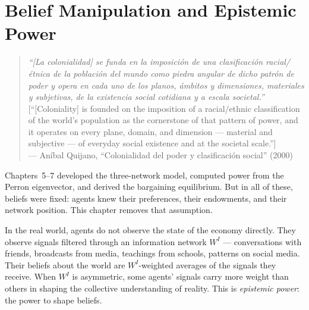 \documentclass[../structural_economics_book.tex]{subfiles}
\begin{document}
\ifSubfilesClassLoaded{\setcounter{chapter}{7}}{}
\chapter{Belief Manipulation and Epistemic Power}\label{ch:08}
\begin{quote}
\textit{``[La colonialidad] se funda en la imposici\'{o}n de una clasificaci\'{o}n racial/\'{e}tnica de la poblaci\'{o}n del mundo como piedra angular de dicho patr\'{o}n de poder y opera en cada uno de los planos, \'{a}mbitos y dimensiones, materiales y subjetivas, de la existencia social cotidiana y a escala societal.''}\\[0.3em]
\textnormal{[``[Coloniality] is founded on the imposition of a racial/ethnic classification of the world's population as the cornerstone of that pattern of power, and it operates on every plane, domain, and dimension --- material and subjective --- of everyday social existence and at the societal scale.'']}\\
\hfill --- An\'{i}bal Quijano, ``Colonialidad del poder y clasificaci\'{o}n social'' (2000)
\end{quote}
\nocite{quijano2000colonialidadclasificacion}

\vspace{1em}

Chapters~5--7 developed the three-network model, computed power from the Perron eigenvector, and derived the bargaining equilibrium. But in all of these, beliefs were fixed: agents knew their preferences, their endowments, and their network position. This chapter removes that assumption.

In the real world, agents do not observe the state of the economy directly. They observe signals filtered through an information network $W^I$ --- conversations with friends, broadcasts from media, teachings from schools, patterns on social media. Their beliefs about the world are $W^I$-weighted averages of the signals they receive. When $W^I$ is asymmetric, some agents' signals carry more weight than others in shaping the collective understanding of reality. This is \textit{epistemic power}: the power to shape beliefs.
\end{document}
